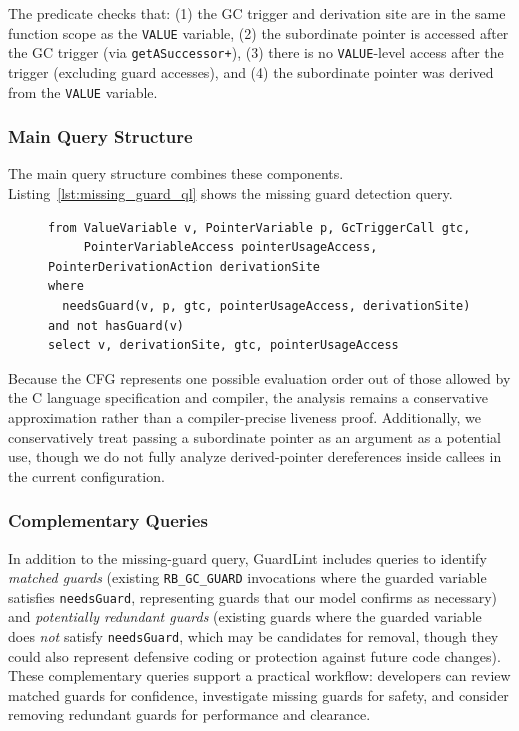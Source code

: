 The predicate checks that: (1) the GC trigger and derivation site are in the same function scope as the \texttt{VALUE} variable, (2) the subordinate pointer is accessed after the GC trigger (via \texttt{getASuccessor+}), (3) there is no \texttt{VALUE}-level access after the trigger (excluding guard accesses), and (4) the subordinate pointer was derived from the \texttt{VALUE} variable.

\subsubsection*{Main Query Structure}
The main query structure combines these components. Listing~\ref{lst:missing_guard_ql} shows the missing guard detection query.

\begin{figure}[tb]
\begin{lstlisting}[caption={Main query for detecting omitted guards.},label={lst:missing_guard_ql}]
from ValueVariable v, PointerVariable p, GcTriggerCall gtc,
     PointerVariableAccess pointerUsageAccess, PointerDerivationAction derivationSite
where
  needsGuard(v, p, gtc, pointerUsageAccess, derivationSite) and not hasGuard(v)
select v, derivationSite, gtc, pointerUsageAccess

\end{lstlisting}
\end{figure}

Because the CFG represents one possible evaluation order out of those allowed by the C language specification and compiler, the analysis remains a conservative approximation rather than a compiler-precise liveness proof. Additionally, we conservatively treat passing a subordinate pointer as an argument as a potential use, though we do not fully analyze derived-pointer dereferences inside callees in the current configuration.

\subsubsection*{Complementary Queries}
In addition to the missing-guard query, GuardLint includes queries to identify \emph{matched guards} (existing \texttt{RB\_GC\_GUARD} invocations where the guarded variable satisfies \texttt{needsGuard}, representing guards that our model confirms as necessary) and \emph{potentially redundant guards} (existing guards where the guarded variable does \emph{not} satisfy \texttt{needsGuard}, which may be candidates for removal, though they could also represent defensive coding or protection against future code changes). These complementary queries support a practical workflow: developers can review matched guards for confidence, investigate missing guards for safety, and consider removing redundant guards for performance and clearance.
